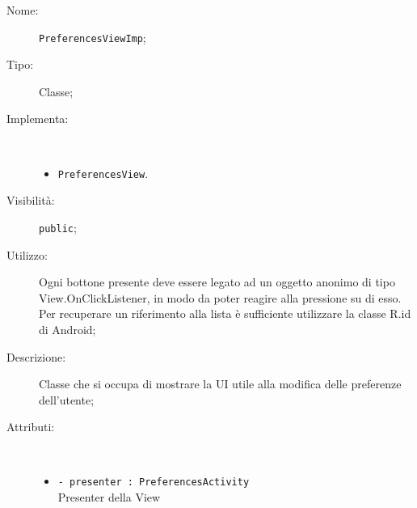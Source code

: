 \documentclass[../DefinizioneDiProdotto.tex]{subfiles}
\begin{document}
\begin{description}
	\item[Nome:] \texttt{PreferencesViewImp};
	\item[Tipo:] Classe;
	\item[Implementa:] \
	\begin{itemize}
		\item \texttt{PreferencesView}.
		
	\end{itemize}
	\item[Visibilità:] \texttt{public};
	\item[Utilizzo:] Ogni bottone presente deve essere legato ad un oggetto anonimo di tipo View.OnClickListener, in modo da poter reagire alla pressione su di esso. Per recuperare un riferimento alla lista è sufficiente utilizzare la classe R.id di Android;
	\item[Descrizione:] Classe che si occupa di mostrare la UI utile alla modifica delle preferenze dell'utente;
	\item[Attributi:] \
	\begin{itemize}
		\item \texttt{- presenter : PreferencesActivity}\\
		Presenter della View
		

\end{itemize}
\end{description}
\end{document}
